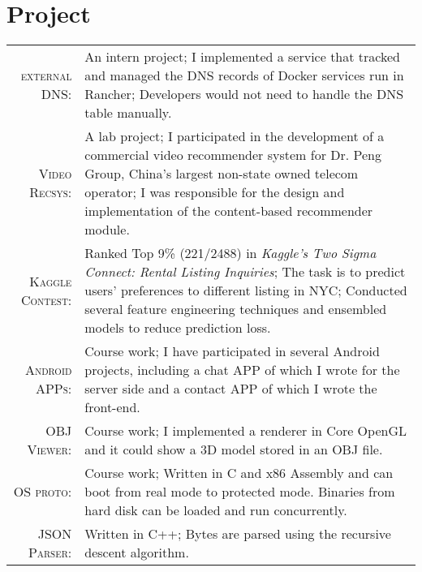 \documentclass[a4paper,10pt]{article} %
\begin{document}
\section{Project}

\begin{tabular}{rp{11cm}}
	
	\textsc{external DNS:} & An intern project; I implemented a service that tracked and managed the DNS records of Docker services run in Rancher; Developers would not need to handle the DNS table manually.
	
	\\
	
	\textsc{Video Recsys:} & A lab project; I participated in the development of a commercial  video recommender system for Dr. Peng Group, China's largest non-state owned telecom operator; I was responsible for the design and implementation of the content-based recommender module.
	
	\\
	
	
	\textsc{Kaggle Contest:} & Ranked Top 9\% (221/2488) in \textit{Kaggle's Two Sigma Connect: Rental Listing Inquiries}; The task is to predict users' preferences to different listing in NYC;  Conducted several feature engineering techniques and ensembled models to reduce prediction loss.
	
	\\
	
	
	\textsc{Android APPs:} & Course work; I have participated in several Android projects, including a chat APP of which I wrote for the server side and a contact APP of which I wrote the front-end.
	
	\\
	
	\textsc{OBJ Viewer:}  & Course work; I implemented a renderer in Core OpenGL and it could show a 3D model stored in an  OBJ file. 
	
	\\
	
	\textsc{OS proto:} & Course work; Written in C and x86 Assembly and can boot from real mode to protected  mode. Binaries from hard disk can be loaded and run concurrently.
	
	\\
	
	\textsc{JSON Parser:} & Written in C++; Bytes are parsed using the recursive descent algorithm.
	
	
	
\end{tabular}
\end{document}
